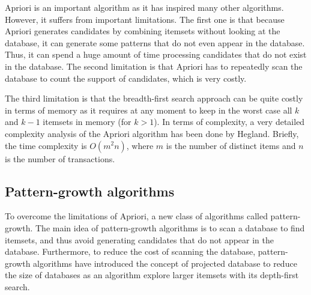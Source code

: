Apriori is an important algorithm as it has inspired many other algorithms. However, it
suffers from important limitations. The first one is that because Apriori generates candidates
by combining itemsets without looking at the database, it can generate some patterns that
do not even appear in the database. Thus, it can spend a huge amount of time processing
candidates that do not exist in the database. The second limitation is that Apriori has to
repeatedly scan the database to count the support of candidates, which is very costly.

The third limitation is that the breadth-first search approach can be quite costly in terms of
memory as it requires at any moment to keep in the worst case all $k$ and $k - 1$ itemsets
in memory (for $k > 1$). In terms of complexity, a very detailed complexity analysis of the
Apriori algorithm has been done by Hegland\cite{hegland}. Briefly, the time complexity is $O(m^2n)$,
where $m$ is the number of distinct items and $n$ is the number of transactions.

\subsection{Pattern-growth algorithms}
To overcome the limitations of Apriori, a new class of algorithms called pattern-growth.
The main idea of pattern-growth algorithms is to scan a database
to find itemsets, and thus avoid generating candidates that do not appear in the database.
Furthermore, to reduce the cost of scanning the database, pattern-growth algorithms have
introduced the concept of projected database to reduce the size of databases as an algorithm
explore larger itemsets with its depth-first search.

